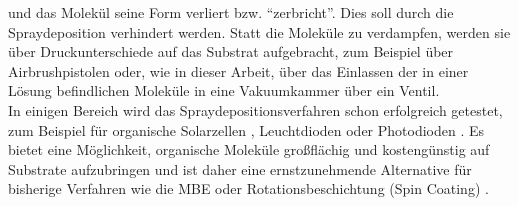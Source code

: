 und das Molekül seine Form verliert bzw. "`zerbricht"'. Dies soll durch die Spraydeposition
verhindert werden. Statt die Moleküle zu verdampfen, werden sie über Druckunterschiede auf das
Substrat aufgebracht, zum Beispiel über Airbrushpistolen oder, wie in dieser Arbeit, über das
Einlassen der in einer Lösung befindlichen Moleküle in eine Vakuumkammer über ein Ventil.
\\
In einigen Bereich wird das Spraydepositionsverfahren schon erfolgreich getestet, zum Beispiel für
organische Solarzellen \cite{Tait}\cite{Hoth}, Leuchtdioden \cite{Wu} oder Photodioden \cite{Ted}.
Es bietet eine Möglichkeit, organische Moleküle großflächig und kostengünstig auf Substrate aufzubringen
\cite{Sun}\cite{Seok} und ist daher eine ernstzunehmende Alternative für bisherige Verfahren wie
die MBE oder Rotationsbeschichtung (Spin Coating) \cite{Alaa}.
